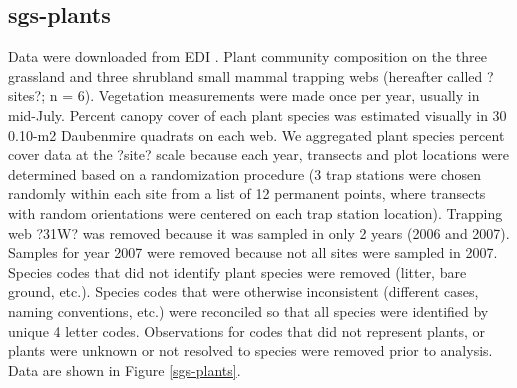\documentclass[11pt, oneside]{article}
\begin{document}
\subsection{sgs-plants}
Data were downloaded from EDI \citep{sgs-plants}.
Plant community composition on the three grassland and three shrubland small mammal trapping webs (hereafter called ?sites?; n = 6). 
Vegetation measurements were made once per year, usually in mid-July. 
Percent canopy cover of each plant species was estimated visually in 30 0.10-m2 Daubenmire quadrats on each web. 
We aggregated plant species percent cover data at the ?site? scale because each year, transects and plot locations were determined based on a randomization procedure (3 trap stations were chosen randomly within each site from a list of 12 permanent points, where transects with random orientations were centered on each trap station location). 
Trapping web ?31W? was removed because it was sampled in only 2 years (2006 and 2007).
Samples for year 2007 were removed because not all sites were sampled in 2007.
Species codes that did not identify plant species were removed (litter, bare ground, etc.).
Species codes that were otherwise inconsistent (different cases, naming conventions, etc.) were reconciled so that all species were identified by unique 4 letter codes.
Observations for codes that did not represent plants, or plants were unknown or not resolved to species were removed prior to analysis.
Data are shown in Figure \ref{sgs-plants}.
\end{document}
